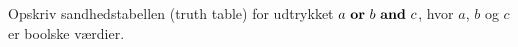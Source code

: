 Opskriv sandhedstabellen (truth table) for udtrykket $a \text{ \texttt{\bf or} } b \text{ \texttt{\bf and} } c$, hvor $a$, $b$ og $c$ er boolske værdier.
